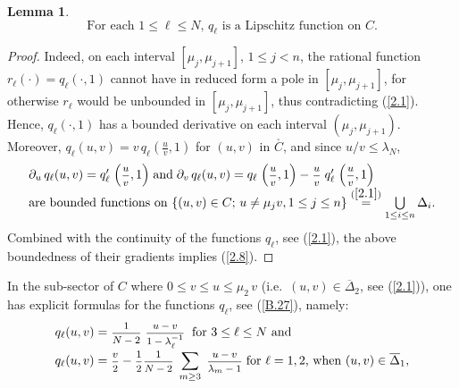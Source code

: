 \documentclass[12pt,leqno]{article}
\def\dis{\displaystyle}
\def\ov{\overline}
\def\f{\footnotesize}
\newtheorem{lemma}[theorem]{Lemma}
\begin{document}
\begin{lemma}\label{lem2.1}
\begin{equation}\label{2.8}
\mbox{For each $1 \le \ell \le N$, $q_\ell$ is a Lipschitz function on $C$.}
\end{equation}
\end{lemma}

\begin{proof}
Indeed, on each interval $[\mu_j, \mu_{j+1}]$, $1 \le j < n$, the rational function $r_\ell(\cdot) = q_\ell(\cdot, 1)$ cannot have in reduced form a pole in $[\mu_j, \mu_{j+1}]$, for otherwise $r_\ell$ would be unbounded in $[\mu_j, \mu_{j+1}]$, thus contradicting (\ref{2.1}). Hence, $q_\ell( \cdot, 1)$ has a bounded derivative on each interval $(\mu_j, \mu_{j+1})$. Moreover, $q_\ell(u,v) = v \, q_\ell(\frac{u}{v}, 1)$ for $(u,v)$ in $\stackrel{_\circ}{C}$, and since $u/v \le \lambda_N$,
\begin{equation}\label{2.9}
\begin{array}{l}
\partial_u \,q_\ell(u,v) = q^\prime_\ell \;\Big(\mbox{\f $\dis\frac{u}{v}$}, 1\Big)\; \mbox{and} \; \partial_v \, q_\ell (u,v) = q_\ell \; \Big(\mbox{\f $\dis\frac{u}{v}$}, 1\Big) - \mbox{\f $\dis\frac{u}{v}$} \; q^\prime_\ell \; \Big(\mbox{\f $\dis\frac{u}{v}$}, 1\Big)
\\
\mbox{are bounded functions on $\{(u,v) \in C$; $u \not= \mu_j v, 1 \le j \le n\} \stackrel{(\ref{2.1})}{=} \bigcup\limits_{1 \le i \le n} \Delta_i$}. 
\end{array}
\end{equation}
Combined with the continuity of the functions $q_\ell$, see (\ref{2.1}), the above boundedness of their gradients implies (\ref{2.8}).
\end{proof}

In the sub-sector of $C$ where $0 \le v \le u \le \mu_2 \,v$ (i.e.~$(u,v) \in \ov{\Delta}_2$, see (\ref{2.1})), one has explicit formulas for the functions $q_\ell$, see (\ref{B.27}), namely:
\begin{equation}\label{2.10}
\begin{array}{l}
q_\ell (u,v) = \mbox{\f $\dis\frac{1}{N-2}$} \; \mbox{\f $\dis\frac{u-v}{1 - \lambda^{-1}_\ell}$}\;\;\mbox{for $3 \le \ell \le N$ and}
\\[2ex]
q_\ell (u,v) = \mbox{\f $\dis\frac{v}{2}$} - \mbox{\f $ \dis\frac{1}{2} \dis\frac{1}{N-2}$}  \; \dis\sum_{m \ge 3} \; \mbox{\f $\dis\frac{u-v}{\lambda_m - 1}$} \; \mbox{for $\ell = 1,2$, when $(u,v) \in \ov{\Delta}_1$}, 
\end{array}
\end{equation}
\end{document}
